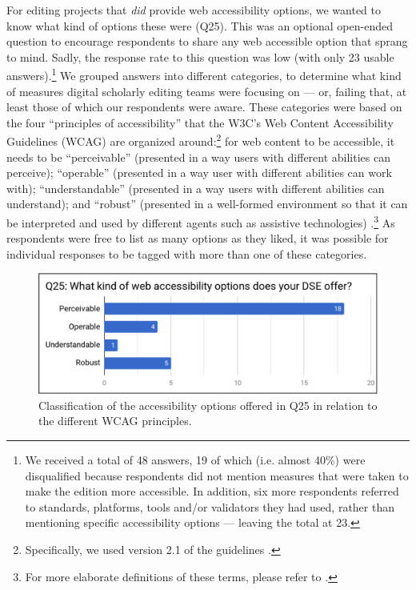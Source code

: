 \begin{paper}
For editing projects that \emph{did} provide web accessibility options,
we wanted to know what kind of options these were (Q25). This was an
optional open-ended question to encourage respondents to share any web
accessible option that sprang to mind. Sadly, the response rate to this
question was low (with only 23 usable answers).\footnote{We received a
  total of 48 answers, 19 of which (i.e. almost 40\%) were disqualified
  because respondents did not mention measures that were taken to make
  the edition more accessible. In addition, six more respondents
  referred to standards, platforms, tools and/or validators they had
  used, rather than mentioning specific accessibility options --- leaving
  the total at 23.} We grouped answers into different categories, to
determine what kind of measures digital scholarly editing teams were
focusing on --- or, failing that, at least those of which our respondents
were aware. These categories were based on the four ``principles of
accessibility'' that the W3C's Web Content Accessibility Guidelines
(WCAG) are organized around:\footnote{Specifically, we used version 2.1
  of the guidelines \citep[see][]{w3c_web_2018}.}
for web content to be accessible, it needs to be ``perceivable''
(presented in a way users with different abilities can perceive);
``operable'' (presented in a way user with different abilities can work
with); ``understandable'' (presented in a way users with different
abilities can understand); and ``robust'' (presented in a well-formed
environment so that it can be interpreted and used by different agents
such as assistive technologies) \citep{w3c_introduction_2018}.\footnote{For
  more elaborate definitions of these terms, please refer to \citet{w3c_introduction_2018}.}
As respondents were free to list as many options as they liked, it was
possible for individual responses to be tagged with more than one of
these categories.

\begin{figure}[!ht]
\includegraphics[width=\textwidth]{media/martinez4.png}
\caption{Classification of the accessibility options offered in
Q25 in relation to the different WCAG principles.}
\label{q25}
\end{figure}


\end{paper}
